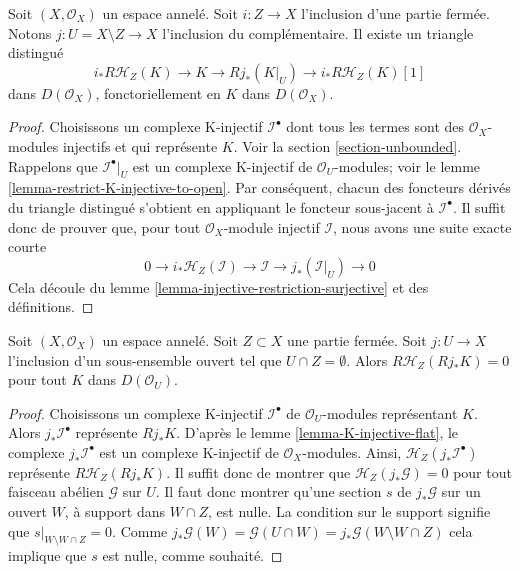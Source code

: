 \begin{lemma}

\label{lemma-triangle-sections-with-support-sheaves}
Soit $(X, \mathcal{O}_X)$ un espace annelé. Soit $i : Z \to X$ l'inclusion d'une partie fermée. Notons $j : U = X \setminus Z \to X$ l'inclusion du complémentaire. Il existe un triangle distingué $$
i_*R\mathcal{H}_Z(K) \to K \to Rj_*(K|_U) \to
i_*R\mathcal{H}_Z(K)[1]
$$ dans $D(\mathcal{O}_X)$, fonctoriellement en $K$ dans $D(\mathcal{O}_X)$.
\end{lemma}

\begin{proof}

Choisissons un complexe K-injectif $\mathcal{I}^\bullet$ dont tous les termes sont des $\mathcal{O}_X$-modules injectifs et qui représente $K$. Voir la section \ref{section-unbounded}. Rappelons que $\mathcal{I}^\bullet|_U$
est un complexe K-injectif de $\mathcal{O}_U$-modules; voir le lemme \ref{lemma-restrict-K-injective-to-open}. Par conséquent, chacun des foncteurs dérivés du triangle distingué s'obtient en appliquant le foncteur sous-jacent à $\mathcal{I}^\bullet$. Il suffit donc de prouver que, pour tout $\mathcal{O}_X$-module injectif $\mathcal{I}$, nous avons une suite exacte courte
$$
0 \to i_*\mathcal{H}_Z(\mathcal{I}) \to \mathcal{I}
\to j_*(\mathcal{I}|_U) \to 0
$$
Cela découle du lemme \ref{lemma-injective-restriction-surjective}
et des définitions.

\end{proof}

\begin{lemma}

\label{lemma-sections-support-in-closed-disjoint-open}
Soit $(X, \mathcal{O}_X)$ un espace annelé. Soit $Z \subset X$ une partie fermée. Soit $j : U \to X$ l'inclusion d'un sous-ensemble ouvert tel que $U \cap Z = \emptyset$. Alors $R\mathcal{H}_Z(Rj_*K) = 0$ pour tout $K$ dans $D(\mathcal{O}_U)$.
\end{lemma}

\begin{proof}

Choisissons un complexe K-injectif $\mathcal{I}^\bullet$ de $\mathcal{O}_U$-modules représentant $K$. Alors $j_*\mathcal{I}^\bullet$ représente $Rj_*K$. D'après le lemme \ref{lemma-K-injective-flat}, le complexe $j_*\mathcal{I}^\bullet$ est un complexe K-injectif de $\mathcal{O}_X$-modules. Ainsi,
$\mathcal{H}_Z(j_*\mathcal{I}^\bullet)$ représente $R\mathcal{H}_Z(Rj_*K)$. Il suffit donc de montrer que $\mathcal{H}_Z(j_*\mathcal{G}) = 0$
pour tout faisceau abélien $\mathcal{G}$ sur $U$. Il faut donc montrer qu'une section $s$ de $j_*\mathcal{G}$ sur un ouvert $W$, à support dans $W \cap Z$, est nulle. La condition sur le support signifie que
$s|_{W \setminus W \cap Z} = 0$. Comme $j_*\mathcal{G}(W) =
\mathcal{G}(U \cap W) = j_*\mathcal{G}(W \setminus W \cap Z)$
cela implique que $s$ est nulle, comme souhaité.

\end{proof}

